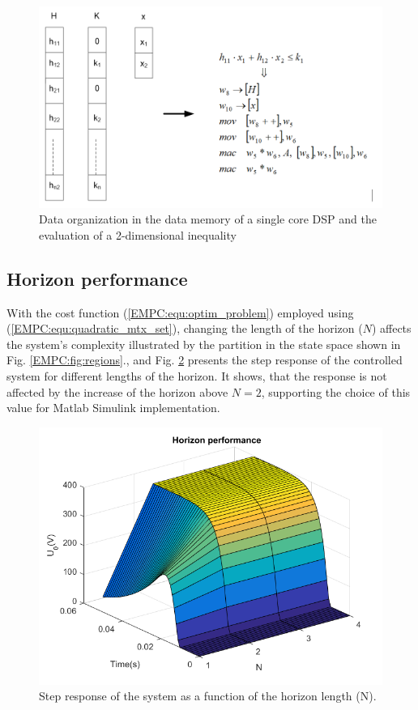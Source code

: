     \begin{figure}[!ht]
        \centering
        \includegraphics[width=\textwidth]{EMPC_PNG_Pics/Memory.png}
        \caption{Data organization in the data memory of a single core DSP and the evaluation of a 2-dimensional inequality}
        \label{EMPC:fig:Memory}
    \end{figure}

    \subsection{Horizon performance}\label{EMPC:sec:Performance}

    With the cost function (\ref{EMPC:equ:optim_problem}) employed using (\ref{EMPC:equ:quadratic_mtx_set}), changing the length of the horizon ($N$) affects the system's complexity illustrated by the partition in the state space shown in Fig. \ref{EMPC:fig:regions}., and Fig. \ref{EMPC:fig:MultiHorizon} presents the step response of the controlled system for different lengths of the horizon. It shows, that the response is not affected by the increase of the horizon above $N=2$, supporting the choice of this value for Matlab Simulink implementation.

    \begin{figure}[!ht]
        \centering
        \includegraphics[width=\textwidth]{EMPC_PNG_Pics/MultiHorizon.png}
        \caption{Step response of the system as a function of the horizon length (N).}
        \label{EMPC:fig:MultiHorizon}
    \end{figure}

